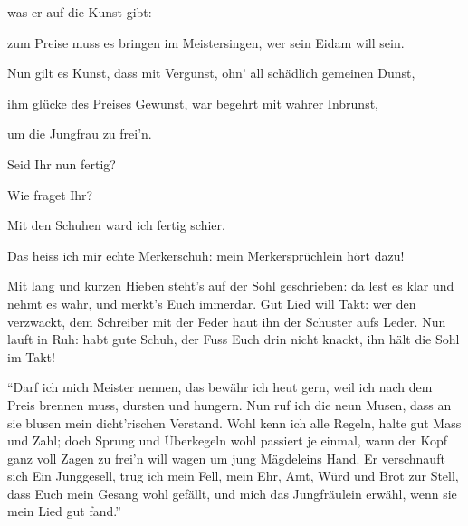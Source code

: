 \begin{drama}

was er auf die Kunst gibt:


zum Preise muss es bringen
im Meistersingen,
wer sein Eidam will sein.


Nun gilt es Kunst, dass mit Vergunst,
ohn' all schädlich gemeinen Dunst,


ihm glücke des Preises Gewunst,
war begehrt mit wahrer Inbrunst,


um die Jungfrau zu frei'n.

\Sachsspeaks


Seid Ihr nun fertig?

\Beckmesserspeaks


Wie fraget Ihr?

\Sachsspeaks


Mit den Schuhen ward ich fertig schier.


Das heiss ich mir echte Merkerschuh:
mein Merkersprüchlein hört dazu!



Mit lang und kurzen Hieben
steht's auf der Sohl geschrieben:
da lest es klar
und nehmt es wahr,
und merkt's Euch immerdar.
Gut Lied will Takt:
wer den verzwackt,
dem Schreiber mit der Feder
haut ihn der Schuster aufs Leder.
Nun lauft in Ruh:
habt gute Schuh,
der Fuss Euch drin nicht knackt,
ihn hält die Sohl im Takt!

\Beckmesserspeaks


``Darf ich mich Meister nennen,
das bewähr ich heut gern,
weil ich nach dem Preis brennen
muss, dursten und hungern.
Nun ruf ich die neun Musen,
dass an sie blusen
mein dicht'rischen Verstand.
Wohl kenn ich alle Regeln,
halte gut Mass und Zahl;
doch Sprung und Überkegeln
wohl passiert je einmal,
wann der Kopf ganz voll Zagen
zu frei'n will wagen
um jung Mägdeleins Hand.
Er verschnauft sich
Ein Junggesell,
trug ich mein Fell,
mein Ehr, Amt, Würd und Brot zur Stell,
dass Euch mein Gesang wohl gefällt,
und mich das Jungfräulein erwähl,
wenn sie mein Lied gut fand.'' 


\end{drama}

